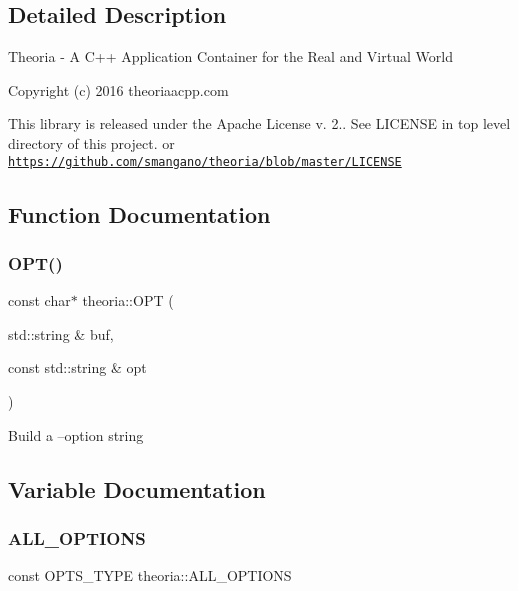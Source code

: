 \subsection{Detailed Description}
Theoria -\/ A C++ Application Container for the Real and Virtual World

Copyright (c) 2016 theoriaacpp.\+com

This library is released under the Apache License v. 2.. See L\+I\+C\+E\+N\+SE in top level directory of this project. or \href{https://github.com/smangano/theoria/blob/master/LICENSE}{\tt https\+://github.\+com/smangano/theoria/blob/master/\+L\+I\+C\+E\+N\+SE} 

\subsection{Function Documentation}
\mbox{\label{namespacetheoria_ad064111544bc341abc915fd30ee47659}} 
\subsubsection{\texorpdfstring{O\+P\+T()}{OPT()}}
{\footnotesize\ttfamily const char$\ast$ theoria\+::\+O\+PT (\begin{DoxyParamCaption}\item[{std\+::string \&}]{buf,  }\item[{const std\+::string \&}]{opt }\end{DoxyParamCaption})\hspace{0.3cm}{\ttfamily [inline]}}

Build a --option string 

\subsection{Variable Documentation}
\mbox{\label{namespacetheoria_a9cf57d3879e75d0b7f451a09dac6a1c0}} 
\subsubsection{\texorpdfstring{A\+L\+L\+\_\+\+O\+P\+T\+I\+O\+NS}{ALL\_OPTIONS}}
{\footnotesize\ttfamily const O\+P\+T\+S\+\_\+\+T\+Y\+PE theoria\+::\+A\+L\+L\+\_\+\+O\+P\+T\+I\+O\+NS}

